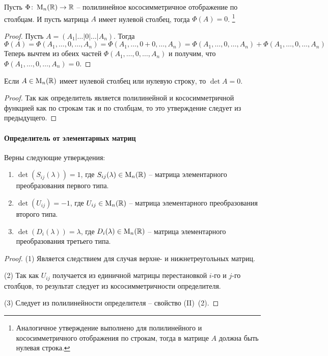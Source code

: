 \begin{claim}
\label{claim::PolyLinearZero}
Пусть $\Phi\colon \operatorname{M}_{n}(\mathbb R)\to \mathbb R$ -- полилинейное кососимметричное отображение по столбцам.
И пусть матрица $A$ имеет нулевой столбец, тогда $\Phi(A) = 0$.%
\footnote{Аналогичное утверждение выполнено для полилинейного и кососимметричного отображения по строкам, тогда в матрице $A$ должна быть нулевая строка.}
\end{claim}
\begin{proof}
Пусть $A = (A_1|\ldots|0|\ldots|A_n)$.
Тогда
\[
\Phi(A) = \Phi(A_1,\ldots, 0, \ldots, A_n) = \Phi(A_1,\ldots, 0 + 0, \ldots, A_n) = \Phi(A_1,\ldots, 0, \ldots, A_n) +\Phi(A_1,\ldots, 0, \ldots, A_n) 
\]
Теперь вычтем из обеих частей $\Phi(A_1,\ldots, 0, \ldots, A_n)$ и получим, что $\Phi(A_1,\ldots, 0, \ldots, A_n) =  0$.
\end{proof}

\begin{claim}
\label{claim::DetZero}
Если $A\in\operatorname{M}_{n}(\mathbb R)$ имеет нулевой столбец или нулевую строку, то $\det A = 0$.
\end{claim}
\begin{proof}
Так как определитель является полилинейной и кососимметричной функцией как по строкам так и по столбцам, то это утверждение следует из предыдущего.
\end{proof}

\paragraph{Определитель от элементарных матриц}

\begin{claim}
\label{claim::DetElems}
Верны следующие утверждения:
\begin{enumerate}
\item $\det (S_{ij}(\lambda)) = 1$, где $S_{ij}(\lambda)\in\operatorname{M}_{n}(\mathbb R)$ -- матрица элементарного преобразования первого типа.

\item $\det (U_{ij}) = -1$, где $U_{ij}\in\operatorname{M}_{n}(\mathbb R)$ -- матрица элементарного преобразования второго типа.

\item $\det(D_i(\lambda)) = \lambda$, где $D_{i}(\lambda)\in\operatorname{M}_{n}(\mathbb R)$ -- матрица элементарного преобразования третьего типа.
\end{enumerate}
\end{claim}
\begin{proof}
(1) Является следствием для случая верхне- и нижнетреугольных матриц.

(2) Так как $U_{ij}$ получается из единичной матрицы перестановкой $i$-го и $j$-го столбцов, то результат следует из кососимметричности определителя.

(3) Следует из полилинейности определителя -- свойство (II)~(2).
\end{proof}


